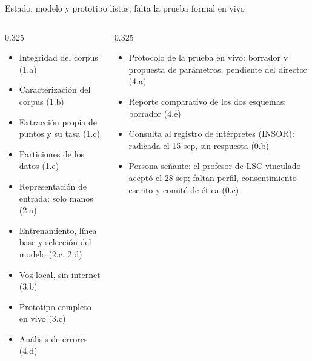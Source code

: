 \documentclass[aspectratio=169,10pt,xcolor={table}]{beamer}
\begin{document}
\begin{frame}{Estado: modelo y prototipo listos; falta la prueba formal en vivo}\label{fr:estado}
\begin{columns}[T]
\begin{column}{0.325\textwidth}
\begin{tcolorbox}[colback=verde!8,colframe=verde,title=\textbf{Hecho},fonttitle=\small,fontupper=\scriptsize,arc=1pt,boxrule=0.6pt,left=3pt,right=3pt,top=2pt,bottom=2pt]
\begin{itemize}\setlength\itemsep{1pt}\setlength\leftmargini{1em}
  \item Integridad del corpus {\color{gris}(1.a)}
  \item Caracterización del corpus {\color{gris}(1.b)}
  \item Extracción propia de puntos y su tasa {\color{gris}(1.c)}
  \item Particiones de los datos {\color{gris}(1.e)}
  \item Representación de entrada: solo manos {\color{gris}(2.a)}
  \item Entrenamiento, línea base y selección del modelo {\color{gris}(2.c, 2.d)}
  \item Voz local, sin internet {\color{gris}(3.b)}
  \item Prototipo completo en vivo {\color{gris}(3.c)}
  \item Análisis de errores {\color{gris}(4.d)}
\end{itemize}
\end{tcolorbox}
\end{column}
\begin{column}{0.325\textwidth}
\begin{tcolorbox}[colback=naranja!8,colframe=naranja,title=\textbf{En curso o en borrador},fonttitle=\small,fontupper=\scriptsize,arc=1pt,boxrule=0.6pt,left=3pt,right=3pt,top=2pt,bottom=2pt]
\begin{itemize}\setlength\itemsep{1pt}
  \item Protocolo de la prueba en vivo: borrador y propuesta de parámetros, pendiente del director {\color{gris}(4.a)}
  \item Reporte comparativo de los dos esquemas: borrador {\color{gris}(4.e)}
  \item Consulta al registro de intérpretes (INSOR): radicada el 15-sep, sin respuesta {\color{gris}(0.b)}
  \item Persona señante: el profesor de LSC vinculado aceptó el 28-sep; faltan perfil, consentimiento escrito y comité de ética {\color{gris}(0.c)}

\end{itemize}
\end{tcolorbox}
\end{column}
\end{columns}
\end{frame}
\end{document}
